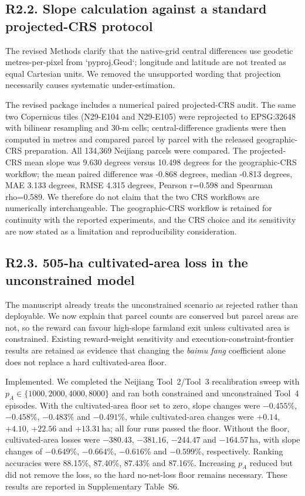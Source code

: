 ﻿\documentclass[11pt]{article}
\begin{document}
\subsection*{R2.2. Slope calculation against a standard projected-CRS protocol}
The revised Methods clarify that the native-grid central differences use geodetic metres-per-pixel from `pyproj.Geod`; longitude and latitude are not treated as equal Cartesian units. We removed the unsupported wording that projection necessarily causes systematic under-estimation.

The revised package includes a numerical paired projected-CRS audit. The same two Copernicus tiles (N29-E104 and N29-E105) were reprojected to EPSG:32648 with bilinear resampling and 30-m cells; central-difference gradients were then computed in metres and compared parcel by parcel with the released geographic-CRS preparation. All 134,369 Neijiang parcels were compared. The projected-CRS mean slope was 9.630 degrees versus 10.498 degrees for the geographic-CRS workflow; the mean paired difference was -0.868 degrees, median -0.813 degrees, MAE 3.133 degrees, RMSE 4.315 degrees, Pearson r=0.598 and Spearman rho=0.589. We therefore do not claim that the two CRS workflows are numerically interchangeable. The geographic-CRS workflow is retained for continuity with the reported experiments, and the CRS choice and its sensitivity are now stated as a limitation and reproducibility consideration.

\subsection*{R2.3. 505-ha cultivated-area loss in the unconstrained model}
The manuscript already treats the unconstrained scenario as rejected rather than deployable. We now explain that parcel counts are conserved but parcel areas are not, so the reward can favour high-slope farmland exit unless cultivated area is constrained. Existing reward-weight sensitivity and execution-constraint-frontier results are retained as evidence that changing the \textit{baimu fang} coefficient alone does not replace a hard cultivated-area floor.

Implemented. We completed the Neijiang Tool~2/Tool~3 recalibration sweep with $p_A\in\{1000,2000,4000,8000\}$ and ran both constrained and unconstrained Tool~4 episodes. With the cultivated-area floor set to zero, slope changes were $-0.455\%$, $-0.458\%$, $-0.483\%$ and $-0.491\%$, while cultivated-area changes were $+0.14$, $+4.10$, $+22.56$ and $+13.31$\,ha; all four runs passed the floor. Without the floor, cultivated-area losses were $-380.43$, $-381.16$, $-244.47$ and $-164.57$\,ha, with slope changes of $-0.649\%$, $-0.664\%$, $-0.616\%$ and $-0.599\%$, respectively. Ranking accuracies were 88.15\%, 87.40\%, 87.43\% and 87.16\%. Increasing $p_A$ reduced but did not remove the loss, so the hard no-net-loss floor remains necessary. These results are reported in Supplementary Table~S6.
\end{document}
